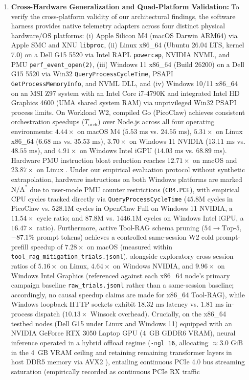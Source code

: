 \documentclass[preprint,12pt,3p]{elsarticle}
\begin{document}
\begin{enumerate}
    \item \textbf{Cross-Hardware Generalization and Quad-Platform Validation:} To verify the cross-platform validity of our architectural findings, the software harness provides native telemetry adapters across four distinct physical hardware/OS platforms: (i) Apple Silicon M4 (macOS Darwin ARM64) via Apple SMC and XNU \texttt{libproc}, (ii) Linux x86\_64 (Ubuntu 26.04 LTS, kernel 7.0) on a Dell G15 5520 via Intel RAPL \texttt{powercap}, NVIDIA NVML, and PMU \texttt{perf\_event\_open(2)}, (iii) Windows 11 x86\_64 (Build 26200) on a Dell G15 5520 via Win32 \texttt{QueryProcessCycleTime}, PSAPI \texttt{GetProcessMemoryInfo}, and NVML DLL, and (iv) Windows 10/11 x86\_64 on an MSI Z97 system with an Intel Core i7-4790K and integrated Intel HD Graphics 4600 (UMA shared system RAM) via unprivileged Win32 PSAPI process limits. On Workload W2, compiled Go (PicoClaw) achieves consistent orchestration speedups ($T_{\text{orch}}$) over Node.js across all four operating environments: $\mathbf{4.44\times}$ on macOS M4 ($5.53\text{ ms}$ vs. $24.55\text{ ms}$), $\mathbf{5.31\times}$ on Linux x86\_64 ($6.68\text{ ms}$ vs. $35.53\text{ ms}$), $\mathbf{3.70\times}$ on Windows 11 NVIDIA ($13.11\text{ ms}$ vs. $48.55\text{ ms}$), and $\mathbf{4.91\times}$ on Windows Intel iGPU ($14.03\text{ ms}$ vs. $68.89\text{ ms}$). Hardware PMU instruction bloat reduction reaches $\mathbf{12.71\times}$ on macOS and $\mathbf{23.87\times}$ on Linux \cite{weaver2013nondeterminism}. Under our empirical evaluation protocol without synthetic extrapolation, hardware instructions on both Windows platforms are marked $\text{N/A}^*$ due to user-mode PMU counter restrictions (\texttt{CR4.PCE}), with empirical CPU cycles tracked directly via \texttt{QueryProcessCycleTime} ($45.8\text{M}$ cycles in PicoClaw vs. $528.1\text{M}$ cycles in OpenClaw Full on Windows 11 NVIDIA, a $11.54\times$ cycle ratio; and $87.8\text{M}$ vs. $1446.1\text{M}$ cycles on Windows Intel iGPU, a $16.47\times$ ratio). Furthermore, active Tool-RAG schema pruning ($54 \rightarrow \text{Top-}5$, $-87.1\%$ prompt tokens) achieves a controlled same-session W2 cold prompt-prefill speedup of $\mathbf{7.28\times}$ on macOS (measured within \texttt{tool\_rag\_mitigation\_trials.jsonl}), alongside exploratory cross-session ratios of $\mathbf{5.16\times}$ on Linux, $\mathbf{4.64\times}$ on Windows NVIDIA, and $\mathbf{9.96\times}$ on Windows Intel Graphics (referenced against each x86\_64 node's primary campaign baseline \texttt{raw\_trials.jsonl} rather than a same-session baseline; accordingly, no causal speedup claims are made for x86\_64 Tool-RAG), while Windows loopback HTTP sockets exhibit $18.32\text{ ms}$ latency vs. $1.81\text{ ms}$ in-process dispatch ($10.13\times$ Winsock overhead). Crucially, on the x86\_64 testbed nodes (Dell G15 under Linux and Windows 11) equipped with an NVIDIA GeForce RTX 3050 Laptop GPU (4~GB GDDR6 VRAM), neural inference operated in a hybrid offload regime (\texttt{-ngl 16}, allocating $\approx 3.0\text{ GiB}$ in the 4~GB VRAM ceiling and retaining remaining transformer layers in host DDR5 memory via AVX2 \cite{sheng2023flexgen}), entailing continuous PCIe 4.0 bus streaming saturation (empirically recorded as continuous PCIe RX traffic 
\end{enumerate}
\end{document}

